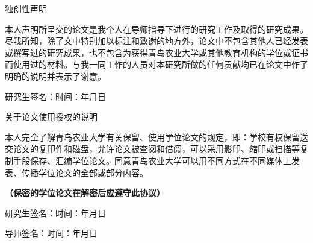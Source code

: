 \thispagestyle{empty}
\begingroup
\setlength{\parindent}{2em}


\begin{center}
{\heiti{}独\quad 创\quad 性\quad 声\quad 明\par}
\end{center}

\vspace{0.95cm}

{\songti{}
本人声明所呈交的论文是我个人在导师指导下进行的研究工作及取得的研究成果。尽我所知，除了文中特别加以标注和致谢的地方外，论文中不包含其他人已经发表或撰写过的研究成果，也不包含为获得青岛农业大学或其他教育机构的学位或证书而使用过的材料。与我一同工作的人员对本研究所做的任何贡献均已在论文中作了明确的说明并表示了谢意。\par}

\vspace{1.8cm}

{\songti{}研究生签名：\hspace{5.0cm}时间：\hspace{1.1cm}年\hspace{0.9cm}月\hspace{0.9cm}日}

\vspace{2.35cm}

\begin{center}
{\heiti{}关于论文使用授权的说明\par}
\end{center}

\vspace{0.72cm}

{\songti{}
本人完全了解青岛农业大学有关保留、使用学位论文的规定，即：学校有权保留送交论文的复印件和磁盘，允许论文被查阅和借阅，可以采用影印、缩印或扫描等复制手段保存、汇编学位论文。同意青岛农业大学可以用不同方式在不同媒体上发表、传播学位论文的全部或部分内容。

\textbf{（保密的学位论文在解密后应遵守此协议）}\par}

\vspace{1.5cm}

{\songti{}研究生签名：\hspace{5cm}时间：\hspace{1.1cm}年\hspace{0.9cm}月\hspace{0.9cm}日}

\endgroup
\thispagestyle{empty}
\vspace*{0.5cm}
{\songti{}导师签名：\hspace{5.4cm}时间：\hspace{1.1cm}年\hspace{0.9cm}月\hspace{0.9cm}日}
